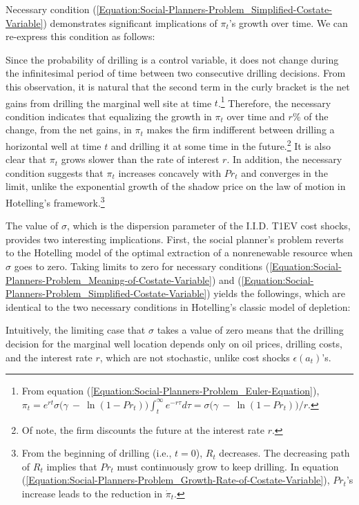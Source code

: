 Necessary condition (\ref{Equation:Social-Planners-Problem_Simplified-Costate-Variable}) demonstrates significant implications of $\pi_{t}$'s growth over time. We can re-express this condition as follows:

Since the probability of drilling is a control variable, it does not change during the infinitesimal period of time between two consecutive drilling decisions. From this observation, it is natural that the second term in the curly bracket is the net gains from drilling the marginal well site at time $t$.\footnote{From equation (\ref{Equation:Social-Planners-Problem_Euler-Equation}), $\pi_{t} = e^{rt} \sigma \big( \gamma \ - \ \ln(1 - Pr_{t}) \big) \int_{t}^{\infty} e^{-r\tau} d\tau = \sigma \big( \gamma \ - \ \ln(1 - Pr_{t}) \big) / r$.} Therefore, the necessary condition indicates that equalizing the growth in $\pi_{t}$ over time and $r$\% of the change, from the net gains, in $\pi_{t}$ makes the firm indifferent between drilling a horizontal well at time $t$ and drilling it at some time in the future.\footnote{Of note, the firm discounts the future at the interest rate $r$.} It is also clear that $\pi_{t}$ grows slower than the rate of interest $r$. In addition, the necessary condition suggests that $\pi_{t}$ increases concavely with $Pr_{t}$ and converges in the limit, unlike the exponential growth of the shadow price on the law of motion in Hotelling's framework.\footnote{From the beginning of drilling (i.e., $t = 0$), $R_{t}$ decreases. The decreasing path of $R_{t}$ implies that $Pr_{t}$ must continuously grow to keep drilling. In equation (\ref{Equation:Social-Planners-Problem_Growth-Rate-of-Costate-Variable}), $Pr_{t}$'s increase leads to the reduction in $\dot{\pi}_{t}$.}

The value of $\sigma$, which is the dispersion parameter of the I.I.D. T1EV cost shocks, provides two interesting implications. First, the social planner's problem reverts to the Hotelling model of the optimal extraction of a nonrenewable resource when $\sigma$ goes to zero. Taking limits to zero for necessary conditions (\ref{Equation:Social-Planners-Problem_Meaning-of-Costate-Variable}) and (\ref{Equation:Social-Planners-Problem_Simplified-Costate-Variable}) yields the followings, which are identical to the two necessary conditions in Hotelling's classic model of depletion:

Intuitively, the limiting case that $\sigma$ takes a value of zero means that the drilling decision for the marginal well location depends only on oil prices, drilling costs, and the interest rate $r$, which are not stochastic, unlike cost shocks $\epsilon(a_{t})$'s. 

